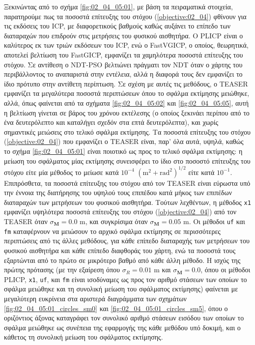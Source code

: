 Ξεκινώντας από το σχήμα \ref{fig:02_04_05:01}, με βάση τα πειραματικά στοιχεία,
παρατηρούμε πως τα ποσοστά επίτευξης του στόχου (\ref{objective:02_04}) φθίνουν
για τις εκδόσεις του ICP, με διαφορετικούς βαθμούς καθώς αυξάνει το επίπεδο των
διαταραχών που επιδρούν στις μετρήσεις του φυσικού αισθητήρα. Ο PLICP είναι ο
καλύτερος εκ των τριών εκδόσεων του ICP, ενώ ο FastVGICP, ο οποίος, θεωρητικά,
αποτελεί βελτίωση του FastGICP, εμφανίζει τα χαμηλότερα ποσοστά επίτευξης του
στόχου.  Σε αντίθεση ο NDT-PSO βελτιώνει πράγματι τον NDT όταν ο χάρτης του
περιβάλλοντος το αναπαριστά στην εντέλεια, αλλά η διαφορά τους δεν εμφανίζει το
ίδιο πρότυπο στην αντίθετη περίπτωση. Σε σχέση με αυτές τις μεθόδους, ο TEASER
εμφανίζει τα μεγαλύτερα ποσοστά περιπτώσεων όπου το σφάλμα εκτίμησης μειώθηκε,
αλλά, όπως φαίνεται από τα σχήματα \ref{fig:02_04_05:02} και
\ref{fig:02_04_05:05}, αυτή η βελτίωση γίνεται σε βάρος του χρόνου εκτέλεσης (ο
οποίος ξεκινάει περίπου από το ένα δευτερόλεπτο και καταλήγει σχεδόν στα επτά
δευτερόλεπτα), και χωρίς σημαντικές μειώσεις στο τελικό σφάλμα εκτίμησης. Τα
ποσοστά επίτευξης του στόχου (\ref{objective:02_04}) που εμφανίζει ο TEASER
είναι, παρ' όλα αυτά, υψηλά, καθώς το σχήμα \ref{fig:02_04_05:01} είναι
ποιοτικό ως προς το τελικό σφάλμα εκτίμησης: η μείωση του σφάλματος μίας
εκτίμησης συνεισφέρει το ίδιο στο ποσοστό επίτευξης του στόχου είτε μία μέθοδος
το μείωσε κατά $10^{-4}$ $(\text{m}^2 + \text{rad}^2)^{1/2}$ είτε κατά
$10^{-1}$. Επιπρόσθετα, τα ποσοστά επίτευξης του στόχου από τον TEASER είναι
εύρωστα υπό την έννοια της διατήρησης του υψηλού τους επιπέδου κατά μήκος των
επιπέδων διαταραχών των μετρήσεων του φυσικού αισθητήρα. Τούτων λεχθέντων, η
μέθοδος \texttt{x1} εμφανίζει υψηλότερα ποσοστά επίτευξης του στόχου
(\ref{objective:02_04}) από τον TEASER όταν $\sigma_{\bm{M}} = 0.0$ m, και
συγκρίσιμα όταν $\sigma_{\bm{M}} = 0.05$ m. Οι μέθοδοι \texttt{uf} και
\texttt{fm} καταφέρνουν να μειώσουν το αρχικό σφάλμα εκτίμησης σε περισσότερες
περιπτώσεις από τις άλλες μεθόδους, για κάθε επίπεδο διαταραχής των μετρήσεων
του φυσικού αισθητήρα και κάθε επίπεδο διαφθοράς του χάρτη, ενώ τα ποσοστά τους
εξαρτώνται από το πρώτο σε μικρότερο βαθμό από κάθε άλλη μέθοδο. Η ισχύς της
πρώτης πρότασης (με την εξαίρεση όπου $\sigma_R = 0.01$ m και $\sigma_{\bm{M}}
= 0.0$, όπου οι μέθοδοι PLICP, \texttt{x1}, \texttt{uf}, και \texttt{fm} είναι
ισοδύναμες ως προς τον αριθμό στάσεων των οποίων το σφάλμα μειώθηκε και τη
συνολική μείωση του σφάλματος εκτίμησης) φαίνεται με μεγαλύτερη ευκρίνεια στα
αριστερά διαγράμματα των σχημάτων \ref{fig:02_04_05:01_circles_sm0} και
\ref{fig:02_04_05:01_circles_sm5}, όπου ο οριζόντιος άξονας καταγράφει τον
συνολικό αριθμό στάσεων εισόδου των οποίων το σφάλμα μειώθηκε ως συνέπεια της
εφαρμογής της κάθε μεθόδου υπό δοκιμή, και ο κάθετος τη συνολική μείωση του
σφάλματος εκτίμησης.

